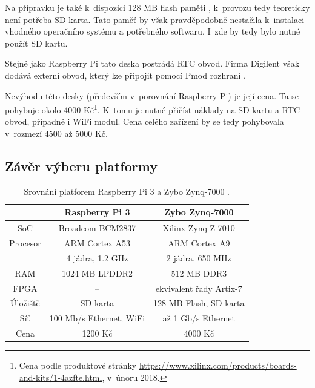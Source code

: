 Na přípravku je také k~dispozici 128 MB flash paměti \cite{zybo_man}, k~provozu tedy teoreticky není potřeba SD karta. Tato paměť by však pravděpodobně nestačila k~instalaci vhodného operačního systému a potřebného softwaru. I~zde by tedy bylo nutné použít SD kartu.

Stejně jako Raspberry Pi tato deska postrádá RTC obvod. Firma Digilent však dodává externí obvod, který lze připojit pomocí Pmod rozhraní \cite{pmod_rtc_man}. 

Nevýhodu této desky (především v~porovnání Raspberry Pi) je její cena. Ta se pohybuje okolo 4000 Kč\footnote{Cena podle produktové stránky \url{https://www.xilinx.com/products/boards-and-kits/1-4azfte.html}, v~únoru 2018.}. K~tomu je nutné přičíst náklady na SD kartu a RTC obvod, případně i WiFi modul. Cena celého zařízení by se tedy pohybovala v~rozmezí 4500 až 5000 Kč.


\subsection{Závěr výberu platformy}

\begin{table}[h!]
\centering
\begin{tabular}{|c | c | c |} 
 \hline
 & \textbf{Raspberry Pi 3} & \textbf{Zybo Zynq-7000} \\
 \hline 
 SoC & Broadcom BCM2837 & Xilinx Zynq Z-7010 \\ 
 Procesor & ARM Cortex A53 & ARM Cortex A9 \\
 & 4 jádra, 1.2 GHz & 2 jádra, 650 MHz \\
 RAM & 1024 MB LPDDR2 & 512 MB DDR3 \\
 FPGA & -- & ekvivalent řady Artix-7 \\
 Úložiště & SD karta & 128 MB Flash, SD karta \\
 Síť & 100 Mb/s Ethernet, WiFi & až 1 Gb/s Ethernet \\
 Cena & 1200 Kč & 4000 Kč \\
 \hline
\end{tabular}
\caption[Srovnání platforem Raspberry Pi 3 a Zybo Zynq-7000]{Srovnání platforem Raspberry Pi 3 a Zybo Zynq-7000 \cite{rpi_benchoff, zybo_man}.}
\label{tab:plat_compare}
\end{table}

